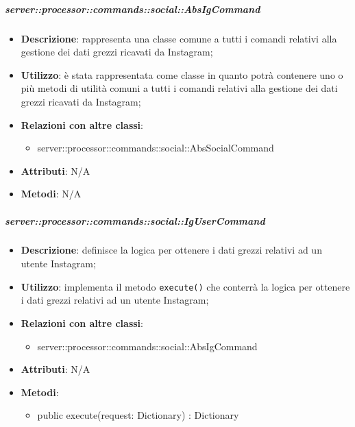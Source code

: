 
        \subparagraph{server::processor::commands::social::AbsIgCommand} %
        \label{subp:bdsm_app_server_processor_commands_social_absigcommand}
        \begin{itemize}
          \item \textbf{Descrizione}: rappresenta una classe comune a tutti i comandi relativi alla gestione dei dati grezzi ricavati da Instagram;
          \item \textbf{Utilizzo}: è stata rappresentata come classe in quanto potrà contenere uno o più metodi di utilità comuni a tutti i comandi relativi alla gestione dei dati grezzi ricavati da Instagram;
          \item \textbf{Relazioni con altre classi}:
            \begin{itemize}
              \item server::processor::commands::social::AbsSocialCommand
            \end{itemize}
			\item \textbf{Attributi}: N/A
			\item \textbf{Metodi}: N/A
        \end{itemize}

        \subparagraph{server::processor::commands::social::IgUserCommand} %
        \label{subp:bdsm_app_server_processor_commands_social_igusercommand}
        \begin{itemize}
          \item \textbf{Descrizione}: definisce la logica per ottenere i dati grezzi relativi ad un utente Instagram;
          \item \textbf{Utilizzo}: implementa il metodo \texttt{execute()} che conterrà la logica per ottenere i dati grezzi relativi ad un utente Instagram;
          \item \textbf{Relazioni con altre classi}:
            \begin{itemize}
              \item server::processor::commands::social::AbsIgCommand
            \end{itemize}
			\item \textbf{Attributi}: N/A
			\item \textbf{Metodi}:
        	\begin{itemize}
          		\item public execute(request: Dictionary) : Dictionary
        	\end{itemize}
        \end{itemize}

